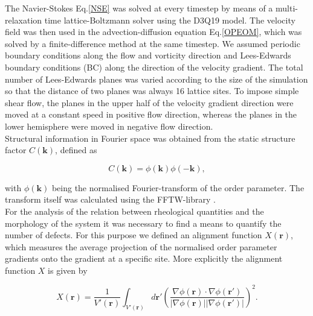 \documentclass[8.5pt,twoside,twocolumn]{article}
\begin{document}
The Navier-Stokes Eq.\ref{NSE} was solved at every timestep by means of a multi-relaxation time lattice-Boltzmann solver \cite{dHumieres02,Adhikari05} using the D3Q19 model.
The velocity field was then used in the advection-diffusion equation Eq.\ref{OPEOM}, which was solved by a finite-difference method at the same timestep. 
We assumed periodic boundary conditions along the flow and vorticity direction and Lees-Edwards boundary conditions (BC) \cite{Wagner02} along the direction of the velocity gradient.
The total number of Lees-Edwards planes was varied according to the size of the simulation so that the distance of two planes was always 16 lattice sites.
To impose simple shear flow, the planes in the upper half of the velocity gradient direction were moved at a constant speed in positive flow direction, whereas the planes in the lower hemisphere were moved in negative flow direction.\\
Structural information in Fourier space was obtained from the static structure factor $C({\mathbf k})$, defined as

\begin{equation}
C({\mathbf k})=\phi({\mathbf k})\phi(-{\mathbf k}),
\end{equation}

with $\phi({\mathbf k})$ being the normalised Fourier-transform of the order parameter.
The transform itself was calculated using the FFTW-library \cite{FFTW}.\\
For the analysis of the relation between rheological quantities and the morphology of the system it was necessary to find a means to quantify the number of defects.
For this purpose we defined an alignment function $X({\mathbf r})$, which measures the average projection of the normalised order parameter gradients onto the gradient at a specific site.
More explicitly the alignment function $X$ is given by

\begin{equation}\label{alignment}
X({\mathbf r})=\frac{1}{V'({\mathbf r})} \int_{V'({\mathbf r})} d{\mathbf r'} \left(\frac{\nabla \phi ({\mathbf r}) \cdot \nabla \phi ({\mathbf r'})}{|\nabla\phi ({\mathbf r}) ||\nabla\phi ({\mathbf r'}) |}\right)^2. 
\end{equation}
\end{document}
